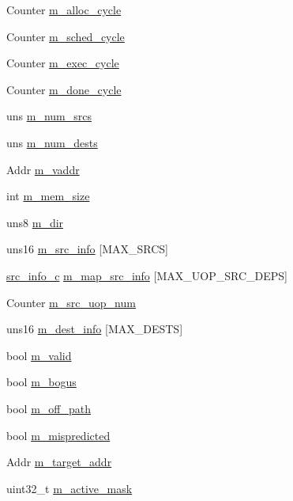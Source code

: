 \begin{DoxyCompactItemize}
\item 
Counter \hyperlink{classuop__c_a36cecb19758b40693067ccf51f600184}{m\_\-alloc\_\-cycle}
\item 
Counter \hyperlink{classuop__c_a0abddd71c924e7ef2c994a68f4a96d2e}{m\_\-sched\_\-cycle}
\item 
Counter \hyperlink{classuop__c_a6817cdf4eb52076177cd8bea6c74089a}{m\_\-exec\_\-cycle}
\item 
Counter \hyperlink{classuop__c_ae9691c0e5dbb1fbe05b57c25193ee0ce}{m\_\-done\_\-cycle}
\item 
uns \hyperlink{classuop__c_a9d462e0b6d7b32a634a44fd979e2987e}{m\_\-num\_\-srcs}
\item 
uns \hyperlink{classuop__c_ac68903d9326230501d9800b68e62d11e}{m\_\-num\_\-dests}
\item 
Addr \hyperlink{classuop__c_a8211cb652547c417466a9aa8fa603e6b}{m\_\-vaddr}
\item 
int \hyperlink{classuop__c_a2b1a6a46c6f697826fdaa258298ad58c}{m\_\-mem\_\-size}
\item 
uns8 \hyperlink{classuop__c_a7e8f609f4cfffed00ff9e4dc24cca06a}{m\_\-dir}
\item 
uns16 \hyperlink{classuop__c_a5511188ca1e9e42c96e926cc43dc997f}{m\_\-src\_\-info} \mbox{[}MAX\_\-SRCS\mbox{]}
\item 
\hyperlink{classsrc__info__c}{src\_\-info\_\-c} \hyperlink{classuop__c_a2d59c4434f359dc0986e39d70c547024}{m\_\-map\_\-src\_\-info} \mbox{[}MAX\_\-UOP\_\-SRC\_\-DEPS\mbox{]}
\item 
Counter \hyperlink{classuop__c_a18571ad6d71b59f3f400956219270523}{m\_\-src\_\-uop\_\-num}
\item 
uns16 \hyperlink{classuop__c_a875407660b76c8ded7c0df96b9a263b5}{m\_\-dest\_\-info} \mbox{[}MAX\_\-DESTS\mbox{]}
\item 
bool \hyperlink{classuop__c_aa18f9a89a6d89e20ba459a3d0dc4f90e}{m\_\-valid}
\item 
bool \hyperlink{classuop__c_a06ee887f6eb340d4a39f317efe4b8118}{m\_\-bogus}
\item 
bool \hyperlink{classuop__c_ad596fa360563f1642c09047c59481abe}{m\_\-off\_\-path}
\item 
bool \hyperlink{classuop__c_afa08f6646fb5b5ce6110057e81c72a13}{m\_\-mispredicted}
\item 
Addr \hyperlink{classuop__c_a60944607488a0ad1e06be21d4e028e26}{m\_\-target\_\-addr}
\item 
uint32\_\-t \hyperlink{classuop__c_a5f8b37c3d7a3b5c8255ab8990cacc93f}{m\_\-active\_\-mask}

\end{DoxyCompactItemize}

